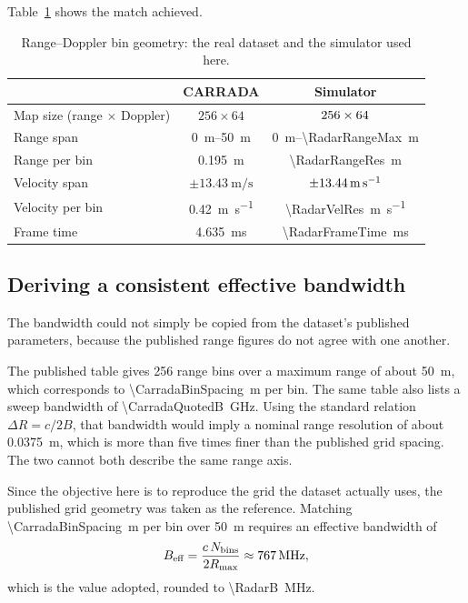 Table~\ref{tab:bingeom} shows the match achieved.

\begin{table}[H]
\centering
\caption{Range--Doppler bin geometry: the real dataset and the simulator used here.}
\label{tab:bingeom}
\begin{tabular}{@{}lcc@{}}
\toprule
 & \textbf{CARRADA} & \textbf{Simulator} \\
\midrule
Map size (range $\times$ Doppler) & $256 \times 64$ & $256 \times 64$ \\
Range span & \SI{0}{\metre}--\SI{50}{\metre} & \SI{0}{\metre}--\SI{\RadarRangeMax}{\metre} \\
Range per bin & \SI{0.195}{\metre} & \SI{\RadarRangeRes}{\metre} \\
Velocity span & $\pm\SI{13.43}{\metre\per\second}$ &
$\pm\SI{13.44}{\metre\per\second}$ \\
Velocity per bin & \SI{0.42}{\metre\per\second} &
\SI{\RadarVelRes}{\metre\per\second} \\
Frame time & \SI{4.635}{\milli\second} & \SI{\RadarFrameTime}{\milli\second} \\
\bottomrule
\end{tabular}
\end{table}

\subsection{Deriving a consistent effective bandwidth}
\label{sec:beff}

The bandwidth could not simply be copied from the dataset's published parameters, because the
published range figures do not agree with one another.

The published table gives 256 range bins over a maximum range of about \SI{50}{\metre}, which
corresponds to \SI{\CarradaBinSpacing}{\metre} per bin. The same table also lists a sweep bandwidth
of \SI{\CarradaQuotedB}{\giga\hertz}. Using the standard relation $\Delta R = c/2B$, that bandwidth
would imply a nominal range resolution of about \SI{0.0375}{\metre}, which is more than five times
finer than the published grid spacing. The two cannot both describe the same range axis.

Since the objective here is to reproduce the grid the dataset actually uses, the published grid
geometry was taken as the reference. Matching \SI{\CarradaBinSpacing}{\metre} per bin over
\SI{50}{\metre} requires an effective bandwidth of
\begin{equation}
B_{\text{eff}} = \frac{c \, N_{\text{bins}}}{2 R_{\max}} \approx \SI{767}{\mega\hertz},
\label{eq:beff}
\end{equation}
which is the value adopted, rounded to \SI{\RadarB}{\mega\hertz}.

